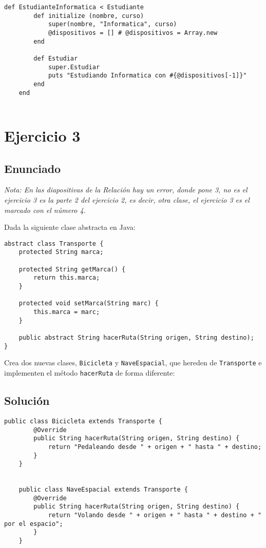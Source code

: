\documentclass[a4paper,12pt]{article}
\begin{document}
\begin{lstlisting}[style=customrb, caption={Clase Estudiante de Informática}]
    def EstudianteInformatica < Estudiante 
        def initialize (nombre, curso)
            super(nombre, "Informatica", curso)
            @dispositivos = [] # @dispositivos = Array.new
        end

        def Estudiar
            super.Estudiar
            puts "Estudiando Informatica con #{@dispositivos[-1]}"
        end
    end


\end{lstlisting}


\section{Ejercicio 3 }
\subsection{Enunciado}


\textit{Nota: En las diapositivas de la Relación hay un error, donde pone 3, no es el ejercicio 3 es la parte 2 del ejercicio 2, es decir, otra clase, el ejercicio 3 es el marcado con el número 4.}


Dada la siguiente clase abstracta en Java:

\begin{lstlisting}[style=customjava]
abstract class Transporte {
    protected String marca;

    protected String getMarca() {
        return this.marca;
    }

    protected void setMarca(String marc) {
        this.marca = marc;
    }

    public abstract String hacerRuta(String origen, String destino);
}
\end{lstlisting}

Crea dos nuevas clases, \texttt{Bicicleta} y \texttt{NaveEspacial}, que hereden de \texttt{Transporte} e implementen el método \texttt{hacerRuta} de forma diferente:

\subsection{Solución}


\begin{lstlisting}[style=customjava, caption={Clase Bicicleta y Clase Nave Espacial}]
    public class Bicicleta extends Transporte {
        @Override
        public String hacerRuta(String origen, String destino) {
            return "Pedaleando desde " + origen + " hasta " + destino;
        }
    }

    
    public class NaveEspacial extends Transporte {
        @Override
        public String hacerRuta(String origen, String destino) {
            return "Volando desde " + origen + " hasta " + destino + " por el espacio";
        }
    }
    
\end{lstlisting}
\end{document}
